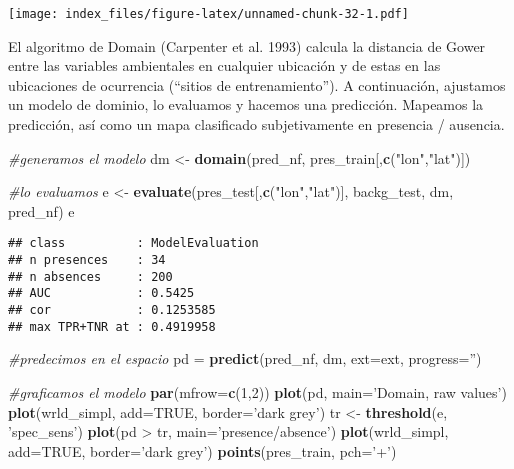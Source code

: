 \documentclass[]{article}
\newenvironment{Shaded}{\begin{snugshade}}{\end{snugshade}}
\newcommand{\KeywordTok}[1]{\textcolor[rgb]{0.13,0.29,0.53}{\textbf{{#1}}}}
\newcommand{\DataTypeTok}[1]{\textcolor[rgb]{0.13,0.29,0.53}{{#1}}}
\newcommand{\DecValTok}[1]{\textcolor[rgb]{0.00,0.00,0.81}{{#1}}}
\newcommand{\StringTok}[1]{\textcolor[rgb]{0.31,0.60,0.02}{{#1}}}
\newcommand{\CommentTok}[1]{\textcolor[rgb]{0.56,0.35,0.01}{\textit{{#1}}}}
\newcommand{\OtherTok}[1]{\textcolor[rgb]{0.56,0.35,0.01}{{#1}}}
\newcommand{\NormalTok}[1]{{#1}}
\begin{document}
\texttt{[image: index\_files/figure-latex/unnamed-chunk-32-1.pdf]}

El algoritmo de Domain (Carpenter et al. 1993) calcula la distancia de
Gower entre las variables ambientales en cualquier ubicación y de estas
en las ubicaciones de ocurrencia (``sitios de entrenamiento''). A
continuación, ajustamos un modelo de dominio, lo evaluamos y hacemos una
predicción. Mapeamos la predicción, así como un mapa clasificado
subjetivamente en presencia / ausencia.

\begin{Shaded}
\begin{Highlighting}[]
\CommentTok{#generamos el modelo}
\NormalTok{dm <-}\StringTok{ }\KeywordTok{domain}\NormalTok{(pred_nf, pres_train[,}\KeywordTok{c}\NormalTok{(}\StringTok{"lon"}\NormalTok{,}\StringTok{"lat"}\NormalTok{)])}

\CommentTok{#lo evaluamos}
\NormalTok{e <-}\StringTok{ }\KeywordTok{evaluate}\NormalTok{(pres_test[,}\KeywordTok{c}\NormalTok{(}\StringTok{"lon"}\NormalTok{,}\StringTok{"lat"}\NormalTok{)], backg_test, dm, pred_nf)}
\NormalTok{e}
\end{Highlighting}
\end{Shaded}

\begin{verbatim}
## class          : ModelEvaluation 
## n presences    : 34 
## n absences     : 200 
## AUC            : 0.5425 
## cor            : 0.1253585 
## max TPR+TNR at : 0.4919958
\end{verbatim}

\begin{Shaded}
\begin{Highlighting}[]
\CommentTok{#predecimos en el espacio}
\NormalTok{pd =}\StringTok{ }\KeywordTok{predict}\NormalTok{(pred_nf, dm, }\DataTypeTok{ext=}\NormalTok{ext, }\DataTypeTok{progress=}\StringTok{''}\NormalTok{)}

\CommentTok{#graficamos el modelo}
\KeywordTok{par}\NormalTok{(}\DataTypeTok{mfrow=}\KeywordTok{c}\NormalTok{(}\DecValTok{1}\NormalTok{,}\DecValTok{2}\NormalTok{))}
\KeywordTok{plot}\NormalTok{(pd, }\DataTypeTok{main=}\StringTok{'Domain, raw values'}\NormalTok{)}
\KeywordTok{plot}\NormalTok{(wrld_simpl, }\DataTypeTok{add=}\OtherTok{TRUE}\NormalTok{, }\DataTypeTok{border=}\StringTok{'dark grey'}\NormalTok{)}
\NormalTok{tr <-}\StringTok{ }\KeywordTok{threshold}\NormalTok{(e, }\StringTok{'spec_sens'}\NormalTok{)}
\KeywordTok{plot}\NormalTok{(pd >}\StringTok{ }\NormalTok{tr, }\DataTypeTok{main=}\StringTok{'presence/absence'}\NormalTok{)}
\KeywordTok{plot}\NormalTok{(wrld_simpl, }\DataTypeTok{add=}\OtherTok{TRUE}\NormalTok{, }\DataTypeTok{border=}\StringTok{'dark grey'}\NormalTok{)}
\KeywordTok{points}\NormalTok{(pres_train, }\DataTypeTok{pch=}\StringTok{'+'}\NormalTok{)}
\end{Highlighting}
\end{Shaded}
\end{document}
